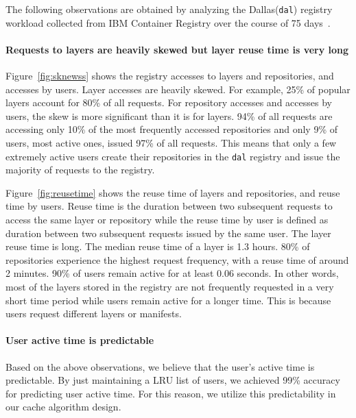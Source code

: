 

The following observations are obtained by analyzing the Dallas(\texttt{dal}) registry workload collected from IBM Container Registry over the course of 75 days~\cite{dockerworkload}. 
\paragraph{Requests to layers are heavily skewed but layer reuse time is very long}

Figure~\ref{fig:sknewss} shows the registry accesses to layers and repositories, and accesses by users. 
Layer accesses are heavily skewed. For example, 25\% of popular layers account for 80\% of all requests. 
For repository accesses and accesses by users, the skew is more significant than it is for layers. %
94\% of all requests are accessing only 10\% of the most frequently accessed repositories and only 9\% of users, most active ones, issued 97\% of all requests. 
This means that only a few extremely active users create their repositories in the \texttt{dal} registry and issue the majority of requests to the registry.

Figure~\ref{fig:reusetime} shows the reuse time of layers and repositories, and reuse time by users.
Reuse time is the duration between two subsequent requests to access the same layer or repository while 
the reuse time by user is defined as duration between two subsequent requests issued by the same user. 
The layer reuse time is long.
The median reuse time of a layer is 1.3 hours. 80\% of repositories experience the highest request frequency, with a reuse time of around 2 minutes. 
90\% of users remain active for at least 0.06 seconds.
In other words, most of the layers stored in the
registry are not frequently requested in a very short
time period while users remain active for a longer time.
This is because users request different layers or manifests.

\paragraph{User active time is predictable} 
Based on the above observations, we believe that the user's active time is predictable. 
By just maintaining a LRU list of users, we achieved 99\% accuracy for predicting user active time.
For this reason, we utilize this predictability in our cache algorithm design.

